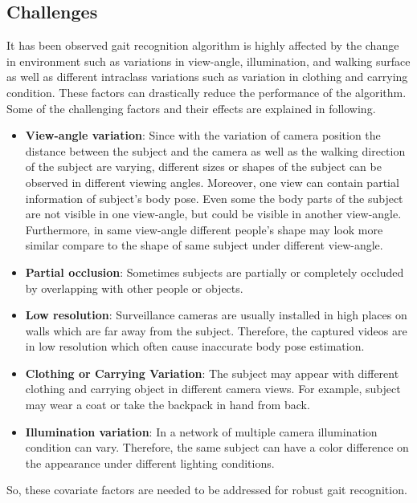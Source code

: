 \subsection{Challenges}
It has been observed gait recognition algorithm is highly affected by the change in environment such as variations in view-angle, illumination, and walking surface as well as different intraclass variations such as variation in clothing and carrying condition. These factors can drastically reduce the performance of the algorithm. Some of the challenging factors and their effects are explained in following.

\begin{itemize}
	\item \textbf{View-angle variation}: Since with the variation of camera position the distance between the subject and the camera as well as the walking direction of the subject are varying, different sizes or shapes of the subject can be observed in different viewing angles. Moreover, one view can contain partial information of subject's body pose. Even some the body parts of the subject are not visible in one view-angle, but could be visible in another view-angle. Furthermore, in same view-angle different people's shape may look more similar compare to the shape of same subject under different view-angle. 
	
	\item \textbf{Partial occlusion}: Sometimes subjects are partially or completely occluded by overlapping with other people or objects. 
	
	\item \textbf{Low resolution}: Surveillance cameras are usually installed in high places on walls which are far away from the subject. Therefore, the captured videos are in low resolution which often cause inaccurate body pose estimation.
	
	\item \textbf{Clothing or Carrying Variation}: The subject may appear with different clothing and carrying object in different camera views. For example, subject may wear a coat or take the backpack in hand from back.
	
	\item \textbf{Illumination variation}: In a network of multiple camera illumination condition can vary. Therefore, the same subject can have a color difference on the appearance under different lighting conditions. 
\end{itemize}

So, these covariate factors are needed to be addressed for robust gait recognition.



